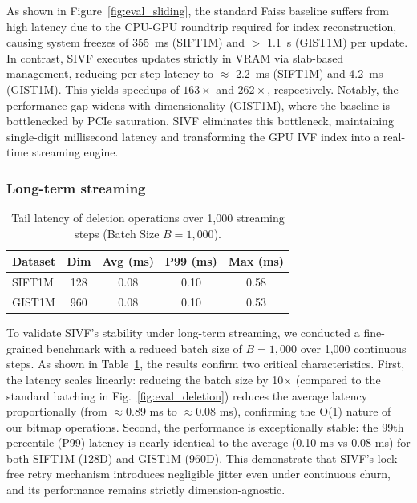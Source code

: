 \documentclass[sigconf,nonacm]{acmart}
\theoremstyle{plain}
\theoremstyle{definition}
\theoremstyle{remark}
\begin{document}
As shown in Figure~\ref{fig:eval_sliding}, the standard Faiss baseline suffers from high latency due to the CPU-GPU roundtrip required for index reconstruction, causing system freezes of 355~ms (SIFT1M) and $>$ 1.1~s (GIST1M) per update.
In contrast, SIVF executes updates strictly in VRAM via slab-based management, reducing per-step latency to $\approx$ 2.2~ms (SIFT1M) and 4.2~ms (GIST1M). This yields speedups of $163\times$ and $262\times$, respectively. Notably, the performance gap widens with dimensionality (GIST1M), where the baseline is bottlenecked by PCIe saturation. SIVF eliminates this bottleneck, maintaining single-digit millisecond latency and transforming the GPU IVF index into a real-time streaming engine.

\subsubsection{Long-term streaming}

\begin{table}[t]
\centering
\caption{Tail latency of deletion operations over 1,000 streaming steps (Batch Size $B=1,000$).}
\label{tab:tail_latency}
\begin{tabular}{l|c|cc|c}
\toprule
\textbf{Dataset} & \textbf{Dim} & \textbf{Avg (ms)} & \textbf{P99 (ms)} & \textbf{Max (ms)} \\
\midrule
SIFT1M  & 128 & 0.08 & 0.10 & 0.58 \\
GIST1M  & 960 & 0.08 & 0.10 & 0.53 \\
\bottomrule
\end{tabular}
\end{table}

To validate SIVF's stability under long-term streaming, we conducted a fine-grained benchmark with a reduced batch size of $B=1,000$ over 1,000 continuous steps.
As shown in Table~\ref{tab:tail_latency}, the results confirm two critical characteristics.
First, the latency scales linearly: reducing the batch size by 10$\times$ (compared to the standard batching in Fig.~\ref{fig:eval_deletion}) reduces the average latency proportionally (from $\approx0.89$ ms to $\approx0.08$ ms), confirming the O(1) nature of our bitmap operations.
Second, the performance is exceptionally stable: the 99th percentile (P99) latency is nearly identical to the average (0.10 ms vs 0.08 ms) for both SIFT1M (128D) and GIST1M (960D).
This demonstrate that SIVF's lock-free retry mechanism introduces negligible jitter even under continuous churn, and its performance remains strictly dimension-agnostic.
\end{document}

